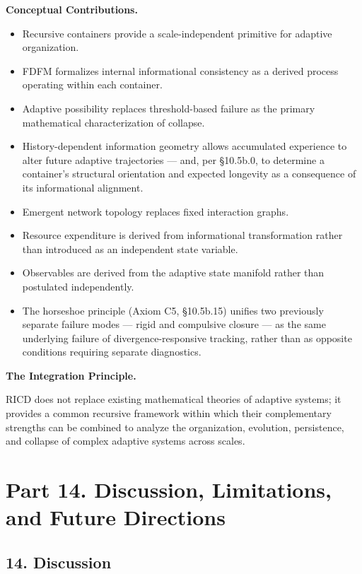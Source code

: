 \documentclass[
]{article}
\begin{document}
\textbf{Conceptual Contributions.}

\begin{itemize}
\item
  Recursive containers provide a scale-independent primitive for
  adaptive organization.
\item
  FDFM formalizes internal informational consistency as a derived
  process operating within each container.
\item
  Adaptive possibility replaces threshold-based failure as the primary
  mathematical characterization of collapse.
\item
  History-dependent information geometry allows accumulated experience
  to alter future adaptive trajectories --- and, per §10.5b.0, to
  determine a container's structural orientation and expected longevity
  as a consequence of its informational alignment.
\item
  Emergent network topology replaces fixed interaction graphs.
\item
  Resource expenditure is derived from informational transformation
  rather than introduced as an independent state variable.
\item
  Observables are derived from the adaptive state manifold rather than
  postulated independently.
\item
  The horseshoe principle (Axiom C5, §10.5b.15) unifies two previously
  separate failure modes --- rigid and compulsive closure --- as the
  same underlying failure of divergence-responsive tracking, rather than
  as opposite conditions requiring separate diagnostics.
\end{itemize}

\textbf{The Integration Principle.}

RICD does not replace existing mathematical theories of adaptive
systems; it provides a common recursive framework within which their
complementary strengths can be combined to analyze the organization,
evolution, persistence, and collapse of complex adaptive systems across
scales.

\hypertarget{part-14.-discussion-limitations-and-future-directions}{%
\section{Part 14. Discussion, Limitations, and Future
Directions}\label{part-14.-discussion-limitations-and-future-directions}}

\hypertarget{discussion}{%
\subsection{14. Discussion}\label{discussion}}
\end{document}
